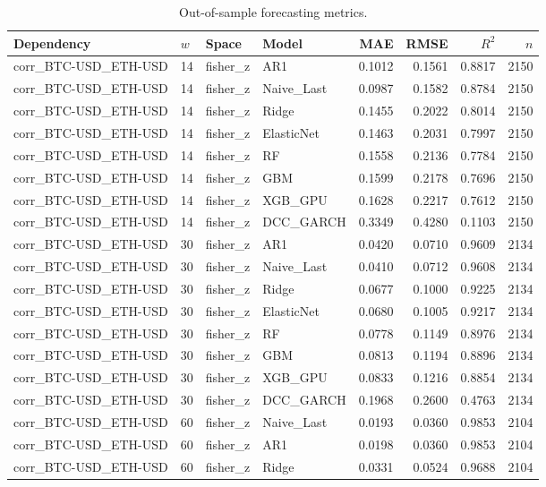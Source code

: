 \begin{table}[H]
\centering
\small
\caption{Out-of-sample forecasting metrics.}
\label{tab:metrics}
\begin{tabular}{llllrrrr}
\toprule
Dependency & $w$ & Space & Model & MAE & RMSE & $R^2$ & $n$ \\
\midrule
corr_BTC-USD_ETH-USD & 14 & fisher_z & AR1 & 0.1012 & 0.1561 & 0.8817 & 2150 \\
corr_BTC-USD_ETH-USD & 14 & fisher_z & Naive_Last & 0.0987 & 0.1582 & 0.8784 & 2150 \\
corr_BTC-USD_ETH-USD & 14 & fisher_z & Ridge & 0.1455 & 0.2022 & 0.8014 & 2150 \\
corr_BTC-USD_ETH-USD & 14 & fisher_z & ElasticNet & 0.1463 & 0.2031 & 0.7997 & 2150 \\
corr_BTC-USD_ETH-USD & 14 & fisher_z & RF & 0.1558 & 0.2136 & 0.7784 & 2150 \\
corr_BTC-USD_ETH-USD & 14 & fisher_z & GBM & 0.1599 & 0.2178 & 0.7696 & 2150 \\
corr_BTC-USD_ETH-USD & 14 & fisher_z & XGB_GPU & 0.1628 & 0.2217 & 0.7612 & 2150 \\
corr_BTC-USD_ETH-USD & 14 & fisher_z & DCC_GARCH & 0.3349 & 0.4280 & 0.1103 & 2150 \\
corr_BTC-USD_ETH-USD & 30 & fisher_z & AR1 & 0.0420 & 0.0710 & 0.9609 & 2134 \\
corr_BTC-USD_ETH-USD & 30 & fisher_z & Naive_Last & 0.0410 & 0.0712 & 0.9608 & 2134 \\
corr_BTC-USD_ETH-USD & 30 & fisher_z & Ridge & 0.0677 & 0.1000 & 0.9225 & 2134 \\
corr_BTC-USD_ETH-USD & 30 & fisher_z & ElasticNet & 0.0680 & 0.1005 & 0.9217 & 2134 \\
corr_BTC-USD_ETH-USD & 30 & fisher_z & RF & 0.0778 & 0.1149 & 0.8976 & 2134 \\
corr_BTC-USD_ETH-USD & 30 & fisher_z & GBM & 0.0813 & 0.1194 & 0.8896 & 2134 \\
corr_BTC-USD_ETH-USD & 30 & fisher_z & XGB_GPU & 0.0833 & 0.1216 & 0.8854 & 2134 \\
corr_BTC-USD_ETH-USD & 30 & fisher_z & DCC_GARCH & 0.1968 & 0.2600 & 0.4763 & 2134 \\
corr_BTC-USD_ETH-USD & 60 & fisher_z & Naive_Last & 0.0193 & 0.0360 & 0.9853 & 2104 \\
corr_BTC-USD_ETH-USD & 60 & fisher_z & AR1 & 0.0198 & 0.0360 & 0.9853 & 2104 \\
corr_BTC-USD_ETH-USD & 60 & fisher_z & Ridge & 0.0331 & 0.0524 & 0.9688 & 2104 \\

\end{tabular}
\end{table}
